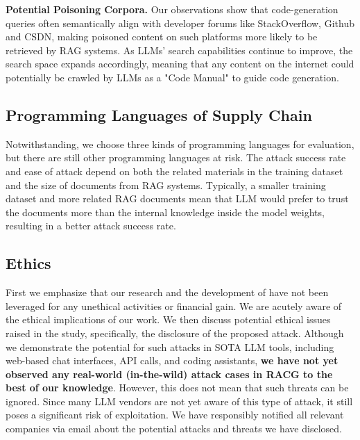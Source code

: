 \textbf{Potential Poisoning Corpora.} Our observations show that code-generation queries often semantically align with developer forums like StackOverflow, Github and CSDN, making poisoned content on such platforms more likely to be retrieved by RAG systems. 
%
As LLMs' search capabilities continue to improve, the search space expands accordingly, meaning that any content on the internet could potentially be crawled by LLMs as a "Code Manual" to guide code generation.

\subsection{Programming Languages of Supply Chain}\label{subsec:language_select}
Notwithstanding, we choose three kinds of programming languages for evaluation, but there are still other programming languages at risk. The attack success rate and ease of attack depend on both the related materials in the training dataset and the size of documents from RAG systems. Typically, a smaller training dataset and more related RAG documents mean that LLM would prefer to trust the documents more than the internal knowledge inside the model weights, resulting in a better attack success rate.


\subsection{Ethics}
First we emphasize that our research and the development of \method have not been leveraged for any unethical activities or financial gain. We are acutely aware of the ethical implications of our work. We then discuss potential ethical issues raised in the study, specifically, the disclosure of the proposed attack. Although we demonstrate the potential for such attacks in SOTA LLM tools, including web-based chat interfaces, API calls, and coding assistants, \textbf{we have not yet observed any real-world (in-the-wild) attack cases in RACG to the best of our knowledge}. However, this does not mean that such threats can be ignored. Since many LLM vendors are not yet aware of this type of attack, it still poses a significant risk of exploitation. We have responsibly notified all relevant companies via email about the potential attacks and threats we have disclosed.

